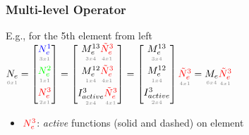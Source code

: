 \documentclass{beamer}
\begin{document}
\begin{frame}
	\frametitle{Multi-level Operator}
	{\small
	E.g., for the 5th element from left\\
	$ \underset{\scriptscriptstyle \textcolor{gray}{6x1}}{N_e} =  \begin{bmatrix}
	\vspace{0.15cm}
	\underset{\scriptscriptstyle \textcolor{gray}{3x1}}{\textcolor{blue}{N^1_e}}  \\
	\vspace{0.15cm}
	\underset{\scriptscriptstyle \textcolor{gray}{1x1}}{\textcolor{green}{N^2_e}}  \\
	\underset{\scriptscriptstyle \textcolor{gray}{2x1}}{\textcolor{red}{N^3_e}}  \\
	\end{bmatrix} = \begin{bmatrix}
	\vspace{0.15cm}
	\underset{\scriptscriptstyle \textcolor{gray}{3x4}}{M^{13}_e}  \underset{\scriptscriptstyle \textcolor{gray}{4x1}}{\textcolor{red}{\tilde N^3_e}} \\
	\vspace{0.15cm}
	\underset{\scriptscriptstyle \textcolor{gray}{1x4}}{M^{12}_e} \underset{\scriptscriptstyle \textcolor{gray}{4x1}}{\textcolor{red}{\tilde N^3_e}} \\
	\underset{\scriptscriptstyle \textcolor{gray}{2x4}}{I^{3}_{active}} \underset{\scriptscriptstyle \textcolor{gray}{4x1}}{\textcolor{red}{\tilde N^3_e}}   \\
	\end{bmatrix}= \begin{bmatrix}
	\vspace{0.15cm}
	\underset{\scriptscriptstyle \textcolor{gray}{3x4}}{M^{13}_e}   \\
	\vspace{0.15cm}
	\underset{\scriptscriptstyle \textcolor{gray}{1x4}}{M^{12}_e}  \\
	\underset{\scriptscriptstyle \textcolor{gray}{2x4}}{I^{3}_{active}}\\
	\end{bmatrix} \underset{\scriptscriptstyle \textcolor{gray}{4x1}}{\textcolor{red}{\tilde N^3_e}} = 
	\underset{\scriptscriptstyle \textcolor{gray}{6x4}}{M_e} \underset{\scriptscriptstyle \textcolor{gray}{4x1}}{\textcolor{red}{\tilde N^3_e}} $	\\
\begin{itemize}
		\item  $ \textcolor{red}{N^3_e} $: \emph{active} functions (solid and dashed) on element 

\end{itemize}}
\end{frame}
\end{document}
